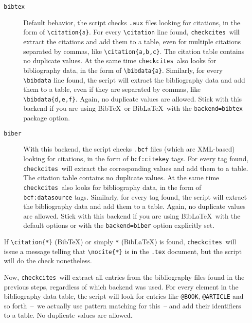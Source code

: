 \documentclass[12pt,a4paper]{article}
\newcommand{\checkcites}{\texttt{checkcites}}
\newenvironment{infoblock}[1]
  {\par\addvspace{\medskipamount}
   \begin{tcolorbox}[colframe=DarkTurquoise,coltitle=black,fonttitle=\bfseries,title=#1]}
  {\end{tcolorbox}\addvspace{\medskipamount}}
\begin{document}
\begin{description}
\item[\texttt{bibtex}]   Default   behavior,    the   script   checks
\verb|.aux|   files   looking  for   citations,   in   the  form   of
\verb|\citation{a}|.   For   every   \verb|\citation|   line   found,
\checkcites\  will   extract  the  citations   and  add  them   to  a
table,  even  for  multiple   citations  separated  by  commas,  like
\verb|\citation{a,b,c}|.  The citation  table  contains no  duplicate
values. At  the same  time \checkcites\  also looks  for bibliography
data,  in  the  form  of  \verb|\bibdata{a}|.  Similarly,  for  every
\verb|\bibdata| line found, the  script will extract the bibliography
data and add them  to a table, even if they  are separated by commas,
like \verb|\bibdata{d,e,f}|. Again, no  duplicate values are allowed.
Stick with this backend if you  are using Bib\TeX\ or Bib\LaTeX\ with
the \verb|backend=bibtex| package option.

\item[\texttt{biber}]   With   this   backend,  the   script   checks
\verb|.bcf| files (which are XML-based) looking for citations, in the
form of  \verb|bcf:citekey| tags.  For every tag  found, \checkcites\
will extract  the corresponding values and  add them to a  table. The
citation  table  contains  no  duplicate values.  At  the  same  time
\checkcites\  also  looks  for  bibliography data,  in  the  form  of
\verb|bcf:datasource|  tags.  Similarly,  for every  tag  found,  the
script will  extract the bibliography data  and add them to  a table.
Again, no  duplicate values are  allowed. Stick with this  backend if
you  are  using Bib\LaTeX\  with  the  default  options or  with  the
\verb|backend=biber| option explicitly set.
\end{description}

\begin{infoblock}{Attention!}
If  \verb|\citation{*}|  (Bib\TeX)  or  simply  \verb|*|  (Bib\LaTeX)
is   found,  \checkcites\   will   issue  a   message  telling   that
\verb|\nocite{*}| is in the \verb|.tex| document, but the script will
do the check nonetheless.
\end{infoblock}

Now,  \checkcites\ will  extract  all entries  from the  bibliography
files found  in the previous  steps, regardless of which  backend was
used. For  every element in  the bibliography data table,  the script
will  look  for entries  like  \verb|@BOOK|,  \verb|@ARTICLE| and  so
forth~--~we actually use  pattern matching for this~--  and add their
identifiers to a table. No duplicate values are allowed.
\end{document}
